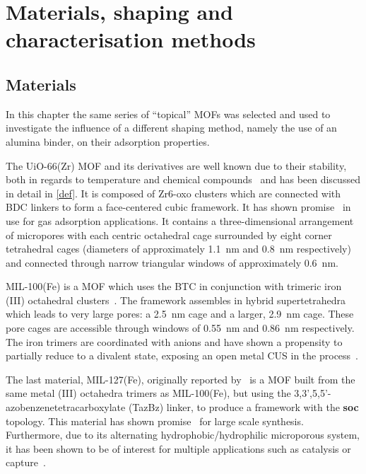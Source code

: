 
\section{Materials, shaping and characterisation methods}

\subsection{Materials}

In this chapter the same series of ``topical'' \glspl{MOF} was selected and
used to investigate the influence of a different shaping method, namely
the use of an alumina binder, on their adsorption properties.

The UiO-66(Zr) \gls{MOF} and its derivatives are well known due to their
stability, both in regards to temperature and chemical
compounds~\cite{cavkaNewZirconiumInorganic2008} and has been
discussed in detail in \autoref{def}. It is composed of
Zr6-oxo clusters which are connected with \gls{BDC} linkers 
to form a face-centered cubic framework. It has
shown promise~\cite{wiersumEvaluationUiO66GasBased2011}
in use for gas adsorption applications. It contains a
three-dimensional arrangement of micropores with each centric
octahedral cage surrounded by eight corner tetrahedral cages
(diameters of approximately \SI{1.1}{\nano\metre} and \SI{0.8}{\nano\metre}
respectively) and connected through narrow triangular windows
of approximately \SI{0.6}{\nano\metre}.

MIL-100(Fe) is a \gls{MOF} which uses the \gls{BTC}
in conjunction with trimeric iron (III) octahedral
clusters~\cite{horcajadaSynthesisCatalyticProperties2007,%
	YangWaterStableMetalOrganic2013}.
The framework assembles in hybrid supertetrahedra which leads to very
large pores: a \SI{2.5}{\nano\metre} cage and a larger, \SI{2.9}{\nano\metre}
cage. These pore cages are accessible through windows of
\SI{0.55}{\nano\metre} and \SI{0.86}{\nano\metre} respectively.
The iron trimers are coordinated with
anions and have shown a propensity to partially reduce to a divalent
 state, exposing an open metal \gls{CUS} in the
process~\cite{yoonControlledReducibilityMetalOrganic2010}.

The last material, MIL-127(Fe), originally reported
by~\citet{liuAssemblyMetalOrganic2007} is a \gls{MOF} built from the same
metal (III) octahedra trimers as MIL-100(Fe), but using the
3,3',5,5'-azobenzenetetracarboxylate (TazBz) linker, to produce a
framework with the \textbf{soc} topology. This material has shown
promise~\cite{chevreauSynthesisBiocompatibleHighly2016}
for large scale synthesis. Furthermore, due to its alternating
hydrophobic/hydrophilic microporous system, it has been shown to be
of interest for multiple applications such as catalysis or
 capture~\cite{chanutScreeningEffectWater2017}.

